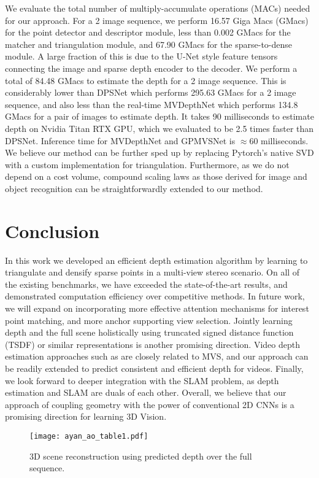 \documentclass[runningheads]{llncs}
\begin{document}
We evaluate the total number of multiply-accumulate operations (MACs) needed for our approach. For a 2 image sequence, we perform 16.57 Giga Macs (GMacs) for the point detector and descriptor module, less than 0.002 GMacs for the matcher and triangulation module, and 67.90 GMacs for the sparse-to-dense module. A large fraction of this is due to the U-Net style feature tensors connecting the image and sparse depth encoder to the decoder. We perform a total of 84.48 GMacs to estimate the depth for a 2 image sequence. This is considerably lower than DPSNet which performs 295.63 GMacs for a 2 image sequence, and also less than the real-time MVDepthNet which performs 134.8 GMacs for a pair of images to estimate depth. It takes 90 milliseconds to estimate depth on Nvidia Titan RTX GPU, which we evaluated to be 2.5 times faster than DPSNet. Inference time for MVDepthNet and GPMVSNet is $\approx 60$ milliseconds. We believe our method can be further sped up by replacing Pytorch's native SVD with a custom  implementation for triangulation. Furthermore, as we do not depend on a cost volume, compound scaling laws as those derived for image \cite{tan2019efficientnet} and object \cite{tan2019efficientdet} recognition can be straightforwardly extended to our method. 





\section{Conclusion}
In this work we developed an efficient depth estimation algorithm by learning to triangulate and densify sparse points in a multi-view stereo scenario. On all of the existing benchmarks, we have exceeded the state-of-the-art results, and demonstrated computation efficiency over competitive methods. In future work, we will expand on incorporating more effective attention mechanisms for interest point matching, and more anchor supporting view selection. Jointly learning depth and the full scene holistically using truncated signed distance function (TSDF) or similar representations is another promising direction. Video depth estimation approaches such as \cite{Luo-VideoDepth-2020} are closely related to MVS, and our approach can be readily extended to predict consistent and efficient depth for videos. Finally, we look forward to deeper integration with the SLAM problem, as depth estimation and SLAM are duals of each other. Overall, we believe that our approach of coupling geometry with the power of conventional 2D CNNs is a promising direction for learning 3D Vision. 
\begin{figure}
\centering
\texttt{[image: ayan\_ao\_table1.pdf]}
\caption{3D scene reconstruction using predicted depth over the full sequence.} 
\label{geo}
\end{figure}
\end{document}

